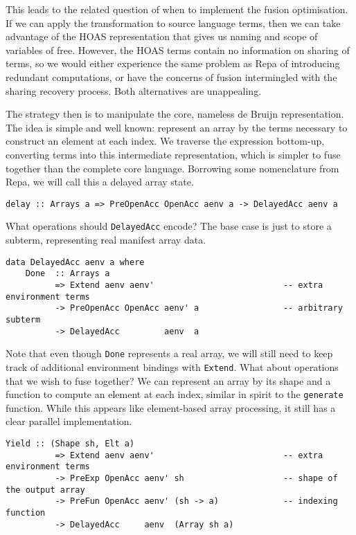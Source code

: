 This leads to the related question of when to implement the fusion optimisation.
If we can apply the transformation to source language terms, then we can take
advantage of the HOAS representation that gives us naming and scope of variables
of free. However, the HOAS terms contain no information on sharing of terms, so
we would either experience the same problem as Repa of introducing redundant
computations, or have the concerns of fusion intermingled with the sharing
recovery process. Both alternatives are unappealing.

The strategy then is to manipulate the core, nameless de Bruijn
representation. The idea is simple and well known: represent an array by the
terms necessary to construct an element at each index. We traverse the
expression bottom-up, converting terms into this intermediate representation,
which is simpler to fuse together than the complete core language. Borrowing
some nomenclature from Repa, we will call this a delayed array state.
%
%
\begin{lstlisting}[style=haskell,numbers=none]
delay :: Arrays a => PreOpenAcc OpenAcc aenv a -> DelayedAcc aenv a
\end{lstlisting}
%
What operations should \texttt{DelayedAcc} encode? The base case is just to
store a subterm, representing real manifest array data.
%
\begin{lstlisting}[style=haskell]
data DelayedAcc aenv a where
    Done  :: Arrays a
          => Extend aenv aenv'                          -- extra environment terms
          -> PreOpenAcc OpenAcc aenv' a                 -- arbitrary subterm
          -> DelayedAcc         aenv  a
\end{lstlisting}
%
Note that even though \texttt{Done} represents a real array, we will still need
to keep track of additional environment bindings with \texttt{Extend}. What
about operations that we wish to fuse together? We can represent an array by its
shape and a function to compute an element at each index, similar in spirit to
the \texttt{generate} function. While this appears like element-based array
processing, it still has a clear parallel implementation.
%
\begin{lstlisting}[style=haskell,firstnumber=last]
    Yield :: (Shape sh, Elt a)
          => Extend aenv aenv'                          -- extra environment terms
          -> PreExp OpenAcc aenv' sh                    -- shape of the output array
          -> PreFun OpenAcc aenv' (sh -> a)             -- indexing function
          -> DelayedAcc     aenv  (Array sh a)
\end{lstlisting}
